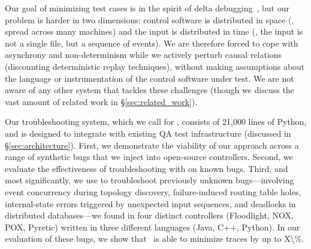 Our goal of minimizing test cases is in the spirit of
delta debugging~\cite{Zeller:1999:YMP:318773.318946}, but our
problem is harder in two dimensions: control software is distributed in space (\ie,
spread across many machines) and the input is distributed in time (\ie, the
input is not a single file, but a sequence of events).
We are therefore forced to cope with asynchrony and non-determinism while
we actively perturb causal relations (discounting deterministic replay
techniques), without making assumptions about the language
or instrumentation of the control software under test.
We are not aware of any other system that tackles these
challenges (though we discuss the vast amount of related work in \S\ref{sec:related_work}).

Our troubleshooting system, which we call {\projectname} for \projectmeaning,
consists of 21,000 lines of Python, and is designed to
integrate with existing QA test infrastructure (discussed in
\S\ref{sec:architecture}). First, we demonstrate the viability of our approach across a
range of synthetic bugs that we inject into open-source controllers. Second, we evaluate
the effectiveness of troubleshooting with {\projectname} on known bugs.
Third, and most significantly, we use {\projectname} to troubleshoot
previously unknown bugs---involving event concurrency during topology discovery,
failure-induced routing table holes, internal-state errors triggered by unexpected
input sequences, and deadlocks in distributed databases---we found in four distinct controllers (Floodlight, NOX, POX, Pyretic)
written in three different languages (Java, C++, Python). In our evaluation of these bugs,
we show that \projectname~is able to minimize traces by up to \num{X\%}.
